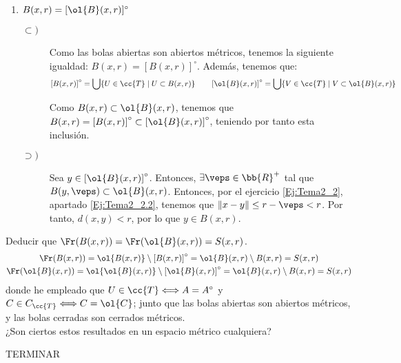 \begin{ejercicio}
\begin{enumerate}
        \item $B(x,r) = [\ol{B}(x,r)]^\circ$
        \begin{description}
            \item[$\subset)$] Como las bolas abiertas son abiertos métricos, tenemos la siguiente igualdad: $B(x,r)=\left[B(x,r)\right]^\circ$. Además, tenemos que:
            \begin{equation*}
                \left[B(x,r)\right]^\circ = \bigcup\{U\in \cc{T}\mid U\subset B(x,r)\}
                \qquad
                \left[\ol{B}(x,r)\right]^\circ = \bigcup\{V\in \cc{T}\mid V\subset \ol{B}(x,r)\}
            \end{equation*}

            Como $B(x,r)\subset \ol{B}(x,r)$, tenemos que $B(x,r)=\left[B(x,r)\right]^\circ\subset \left[\ol{B}(x,r)\right]^\circ$, teniendo por tanto esta inclusión.

            \item[$\supset)$] Sea $y\in \left[\ol{B}(x,r)\right]^\circ$. Entonces, $\exists \veps\in \bb{R}^+$ tal que $B(y,\veps)\subset \ol{B}(x,r)$. Entonces, por el ejercicio \ref{Ej:Tema2_2}, apartado \ref{Ej:Tema2_2.2}, tenemos que $\|x-y\|\leq r-\veps<r$. Por tanto, $d(x,y)<r$, por lo que $y\in B(x,r)$.
        \end{description}
    \end{enumerate}

    Deducir que $\Fr(B(x,r)) = \Fr(\ol{B}(x,r)) = S(x, r)$.
    \begin{gather*}
        \Fr(B(x,r)) = \ol{B(x,r)}\setminus \left[B(x,r)\right]^\circ = \ol{B}(x,r)\setminus B(x,r) = S(x,r) \\
        \Fr(\ol{B}(x,r)) = \ol{\ol{B}(x,r)}\setminus \left[\ol{B}(x,r)\right]^\circ = \ol{B}(x,r)\setminus B(x,r) = S(x,r)
    \end{gather*}
    donde he empleado que $U\in \cc{T}\Longleftrightarrow A=A^\circ$ y $C\in C_\cc{T}\Longleftrightarrow C=\ol{C}$; junto que las bolas abiertas son abiertos métricos, y las bolas cerradas son cerrados métricos.\\    
    
    ¿Son ciertos estos resultados en un espacio métrico cualquiera?

    TERMINAR
\end{ejercicio}

